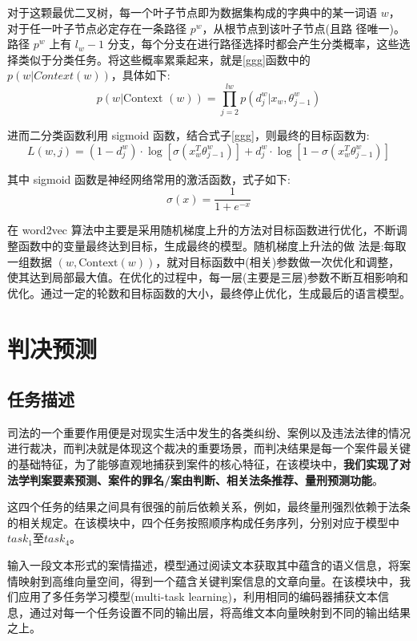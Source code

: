 对于这颗最优二叉树，每一个叶子节点即为数据集构成的字典中的某一词语 $w$，对于任一叶子节点必定存在一条路径 $p^w$，从根节点到该叶子节点(且路 径唯一)。路径 $p^w$ 上有 $l_{w} - 1$ 分支，每个分支在进行路径选择时都会产生分类概率，这些选择类似于分类任务。将这些概率累乘起来，就是\ref{ggg}函数中的 $p(w|Context(w))$，具体如下:
	\begin{equation}
		p(w | \text {Context }(w))=\prod_{j=2}^{l w} p\left(d_{j}^{w} | x_{w}, \theta_{j-1}^{w}\right)
	\end{equation}
	
进而二分类函数利用 sigmoid 函数，结合式子\ref{ggg}，则最终的目标函数为:
\begin{equation}
L(w, j)=\left(1-d_{j}^{w}\right) \cdot \log \left[\sigma\left(x_{w}^{T} \theta_{j-1}^{w}\right)\right]+d_{j}^{w} \cdot \log \left[1-\sigma\left(x_{w}^{T} \theta_{j-1}^{w}\right)\right]
\end{equation}

其中 sigmoid 函数是神经网络常用的激活函数，式子如下:
\begin{equation}
\sigma(x)=\frac{1}{1+e^{-x}}
\end{equation}

在 word2vec 算法中主要是采用随机梯度上升的方法对目标函数进行优化，不断调整函数中的变量最终达到目标，生成最终的模型。随机梯度上升法的做 法是:每取一组数据 $(w, \text{Context}(w))$，就对目标函数中(相关)参数做一次优化和调整，使其达到局部最大值。在优化的过程中，每一层(主要是三层)参数不断互相影响和优化。通过一定的轮数和目标函数的大小，最终停止优化，生成最后的语言模型。


\section{判决预测}
\subsection{任务描述}
司法的一个重要作用便是对现实生活中发生的各类纠纷、案例以及违法法律的情况进行裁决，而判决就是体现这个裁决的重要场景，而判决结果是每一个案件最关键的基础特征，为了能够直观地捕获到案件的核心特征，在该模块中，\textbf{我们实现了对法学判案要素预测、案件的罪名/案由判断、相关法条推荐、量刑预测功能}。

这四个任务的结果之间具有很强的前后依赖关系，例如，最终量刑强烈依赖于法条的相关规定。在该模块中，四个任务按照顺序构成任务序列，分别对应于模型中$task_{1}$至$task_{4}$。

输入一段文本形式的案情描述，模型通过阅读文本获取其中蕴含的语义信息，将案情映射到高维向量空间，得到一个蕴含关键判案信息的文章向量。在该模块中，我们应用了多任务学习模型(multi-task learning)，利用相同的编码器捕获文本信息，通过对每一个任务设置不同的输出层，将高维文本向量映射到不同的输出结果之上。

